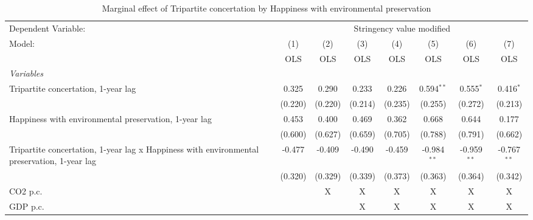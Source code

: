 
\begin{table}[htbp]
   \caption{Marginal effect of Tripartite concertation by Happiness with environmental preservation}
   \centering
   \begin{tabular}{lccccccc}
      \toprule
      Dependent Variable: & \multicolumn{7}{c}{Stringency value modified}\\
      Model:                                                                                      & (1)     & (2)     & (3)     & (4)     & (5)           & (6)           & (7)\\  
                                                                                                  &  OLS    & OLS     & OLS     & OLS     & OLS           & OLS           & OLS\\  
      \midrule
      \emph{Variables}\\
      Tripartite concertation, 1-year lag                                                         & 0.325   & 0.290   & 0.233   & 0.226   & 0.594$^{**}$  & 0.555$^{*}$   & 0.416$^{*}$\\   
                                                                                                  & (0.220) & (0.220) & (0.214) & (0.235) & (0.255)       & (0.272)       & (0.213)\\   
      Happiness with environmental preservation, 1-year lag                                       & 0.453   & 0.400   & 0.469   & 0.362   & 0.668         & 0.644         & 0.177\\   
                                                                                                  & (0.600) & (0.627) & (0.659) & (0.705) & (0.788)       & (0.791)       & (0.662)\\   
      Tripartite concertation, 1-year lag x Happiness with environmental preservation, 1-year lag & -0.477  & -0.409  & -0.490  & -0.459  & -0.984$^{**}$ & -0.959$^{**}$ & -0.767$^{**}$\\   
                                                                                                  & (0.320) & (0.329) & (0.339) & (0.373) & (0.363)       & (0.364)       & (0.342)\\   
      CO2 p.c.                                                                                    &         & X       & X       & X       & X             & X             & X\\  
      GDP p.c.                                                                                    &         &         & X       & X       & X             & X             & X\\  

\end{tabular}
\end{table}
